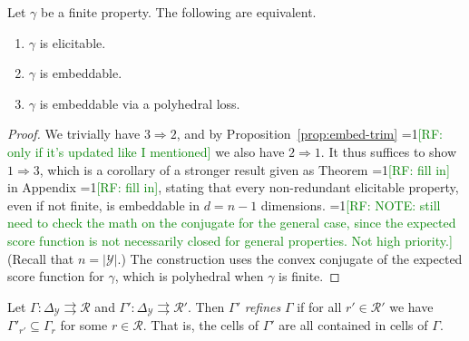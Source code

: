 \documentclass[anon,12pt]{colt2019}
\newcommand{\Comments}{1}
\newcommand{\mynote}[2]{\ifnum\Comments=1\textcolor{#1}{#2}\fi}
\newcommand{\raf}[1]{\mynote{green}{[RF: #1]}}
\newcommand{\simplex}{\Delta_\Y}
\newcommand{\R}{\mathcal{R}}
\newcommand{\Y}{\mathcal{Y}}
\newcommand{\toto}{\rightrightarrows}
\begin{document}
\begin{theorem}
  Let $\gamma$ be a finite property.
  The following are equivalent.
  \begin{enumerate}
  \item $\gamma$ is elicitable.
  \item $\gamma$ is embeddable.
  \item $\gamma$ is embeddable via a polyhedral loss.
  \end{enumerate}
\end{theorem}
\begin{proof}
  We trivially have $3\Rightarrow 2$, and by Proposition~\ref{prop:embed-trim} \raf{only if it's updated like I mentioned} we also have $2\Rightarrow 1$.
  It thus suffices to show $1\Rightarrow 3$, which is a corollary of a stronger result given as Theorem \raf{fill in} in Appendix \raf{fill in}, stating that every non-redundant elicitable property, even if not finite, is embeddable in $d =n-1$ dimensions.
  \raf{NOTE: still need to check the math on the conjugate for the general case, since the expected score function is not necessarily closed for general properties.  Not high priority.}
  (Recall that $n = |\Y|$.)
  The construction uses the convex conjugate of the expected score function for $\gamma$, which is polyhedral when $\gamma$ is finite.
\end{proof}

\begin{definition}
  Let $\Gamma:\simplex\toto\R$ and $\Gamma':\simplex\toto\R'$.
  Then $\Gamma'$ \emph{refines} $\Gamma$ if for all $r'\in\R'$ we have $\Gamma'_{r'} \subseteq \Gamma_r$ for some $r\in\R$.
  That is, the cells of $\Gamma'$ are all contained in cells of $\Gamma$.
\end{definition}
\end{document}
